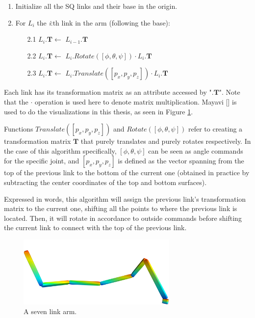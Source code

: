 \begin{enumerate}
	\item Initialize all the \gls{SQ} links and their base in the origin.
	\item For $L_i$ the \textit{i}:th link in the arm (following the base):
	\begin{enumerate}
		\item[2.1] $L_i.\textbf{T} \leftarrow$ $L_{i-1}.\textbf{T}$
		\item[2.2] $L_i.\textbf{T} \leftarrow$ $L_i.Rotate([\phi, \theta, \psi]) \cdot L_i.\textbf{T}$
		\item[2.3] $L_i.\textbf{T} \leftarrow$ $L_i.Translate([p_x, p_y, p_z]) \cdot L_i.\textbf{T}$
	\end{enumerate}
\end{enumerate}

Each link has its transformation matrix as an attribute accessed by "$.\textbf{T}$". Note that the $\cdot$ operation is used here to denote matrix multiplication. Mayavi [\citeauthor{VanderWalt2011}] is used to do the visualizations in this thesis, as seen in Figure \ref{fig:6DoFArm}.

Functions $Translate([p_x, p_y, p_z])$ and $Rotate([\phi, \theta, \psi])$ refer to creating a transformation matrix $\textbf{T}$ that purely translates and purely rotates respectively. In the case of this algorithm specifically, $[\phi, \theta, \psi]$ can be seen as angle commands for the specific joint, and  $[p_x, p_y, p_z]$ is defined as the vector spanning from the top of the previous link to the bottom of the current one (obtained in practice by subtracting the center coordinates of the top and bottom surfaces).

Expressed in words, this algorithm will assign the previous link's transformation matrix to the current one, shifting all the points to where the previous link is located. Then, it will rotate in accordance to outside commands before shifting the current link to connect with the top of the previous link.

\begin{figure}[h]
	\centering
	\includegraphics[width=0.7\textwidth]{import/SQ_6DoF_Arm}
	\caption{A seven link arm.}
	\label{fig:6DoFArm}
\end{figure}

